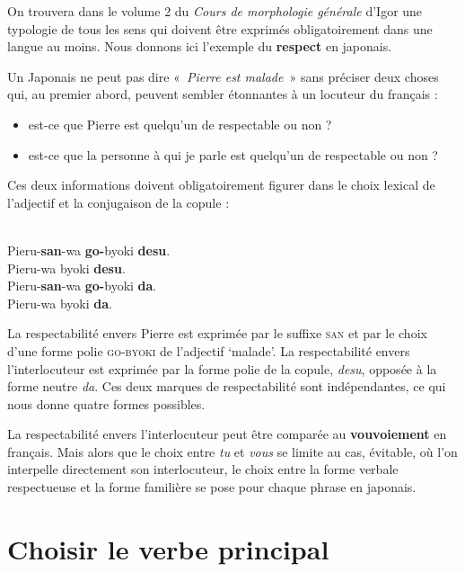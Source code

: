 {    On trouvera dans le volume 2 du \textit{Cours de morphologie générale} d’Igor \cite{melcuk1993cours} une typologie de tous les sens qui doivent être exprimés obligatoirement dans une langue au moins. Nous donnons ici l’exemple du \textbf{respect} en japonais.

    Un Japonais ne peut pas dire «~\textit{Pierre est malade~}» sans préciser deux choses qui, au premier abord, peuvent sembler étonnantes à un locuteur du français :

    \begin{itemize}
    \item  est-ce que Pierre est quelqu’un de respectable ou non ?
    \item  est-ce que la personne à qui je parle est quelqu’un de respectable ou non ?
    \end{itemize}

    Ces deux informations doivent obligatoirement figurer dans le choix lexical de l’adjectif et la conjugaison de la copule :

    \ea
    \\Pieru-\textbf{san}{}-wa \textbf{go-}byoki \textbf{desu}.
    \\Pieru-wa byoki \textbf{desu}.
    \\Pieru-\textbf{san}{}-wa \textbf{go-}byoki \textbf{da}.
    \\Pieru-wa byoki \textbf{da}.
    \z
    \z

    La respectabilité envers Pierre est exprimée par le suffixe \textsc{san} et par le choix d’une forme polie \textsc{go-byoki} de l’adjectif ‘malade’. La respectabilité envers l’interlocuteur est exprimée par la forme polie de la copule, \textit{desu}, opposée à la forme neutre \textit{da}. Ces deux marques de respectabilité sont indépendantes, ce qui nous donne quatre formes possibles.

    La respectabilité envers l’interlocuteur peut être comparée au \textbf{vouvoiement} en français. Mais alors que le choix entre \textit{tu} et \textit{vous} se limite au cas, évitable, où l’on interpelle directement son interlocuteur, le choix entre la forme verbale respectueuse et la forme familière se pose pour chaque phrase en japonais.
}
\section{Choisir le verbe principal}\label{sec:1.2.13}


